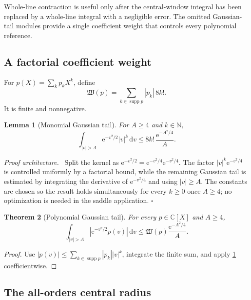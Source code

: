 \documentclass[11pt,oneside]{article}
\newtheorem{theorem}{Theorem}[section]
\newtheorem{lemma}[theorem]{Lemma}
\theoremstyle{definition}
\theoremstyle{remark}
\newcommand{\C}{\mathbb C}
\newcommand{\N}{\mathbb N}
\newcommand{\e}{\mathrm e}
\newcommand{\dd}{\,\mathrm d}
\newcommand{\supp}{\operatorname{supp}}
\newenvironment{proofidea}{\par\smallskip\noindent\textit{Proof architecture.}\ }{\hfill$\square$\par\smallskip}
\begin{document}
Whole-line contraction is useful only after the central-window integral has been replaced by
a whole-line integral with a negligible error.  The omitted Gaussian-tail modules provide a
single coefficient weight that controls every polynomial reference.

\subsection{A factorial coefficient weight}

For $p(X)=\sum_kp_kX^k$, define
\begin{equation}
 \mathfrak W(p)=\sum_{k\in\supp p}|p_k|\,8k!.
 \label{eq:gaussian-tail-weight}
\end{equation}
It is finite and nonnegative.

\begin{lemma}[Monomial Gaussian tail]
\label{lem:monomial-gaussian-tail}
For $A\ge4$ and $k\in\N$,
\begin{equation}
 \int_{|v|>A}\e^{-v^2/2}|v|^k\dd v
 \le 8k!\,\frac{\e^{-A^2/4}}{A}.
 \label{eq:monomial-gaussian-tail}
\end{equation}
\end{lemma}

\begin{proofidea}
Split the kernel as
$\e^{-v^2/2}=\e^{-v^2/4}\e^{-v^2/4}$.  The factor
$|v|^k\e^{-v^2/4}$ is controlled uniformly by a factorial bound, while the remaining
Gaussian tail is estimated by integrating the derivative of $\e^{-v^2/4}$ and using
$|v|\ge A$.  The constants are chosen so the result holds simultaneously for every
$k\ge0$ once $A\ge4$; no optimization is needed in the saddle application.
\end{proofidea}

\begin{theorem}[Polynomial Gaussian tail]
\label{thm:polynomial-gaussian-tail}
For every $p\in\C[X]$ and $A\ge4$,
\begin{equation}
 \int_{|v|>A}\left|\e^{-v^2/2}p(v)\right|\dd v
 \le \mathfrak W(p)\frac{\e^{-A^2/4}}{A}.
 \label{eq:polynomial-gaussian-tail}
\end{equation}
\end{theorem}

\begin{proof}
Use
$|p(v)|\le\sum_{k\in\supp p}|p_k||v|^k$, integrate the finite sum, and apply
\cref{lem:monomial-gaussian-tail} coefficientwise.
\end{proof}

\subsection{The all-orders central radius}
\end{document}

